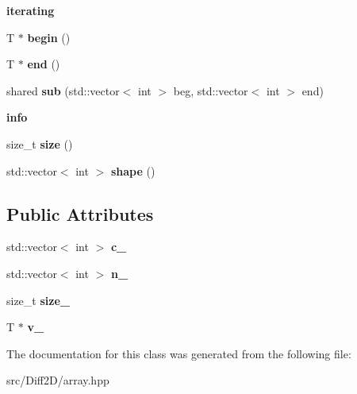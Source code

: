 \begin{Indent}{\bf iterating}\par
\begin{DoxyCompactItemize}
\item 
\hypertarget{class____array_a9e073ed33e0fad10acbbb001af3c10b1}{T $\ast$ {\bfseries begin} ()}\label{class____array_a9e073ed33e0fad10acbbb001af3c10b1}

\item 
\hypertarget{class____array_a0e7f0ce953b4d180a940c14e34b503db}{T $\ast$ {\bfseries end} ()}\label{class____array_a0e7f0ce953b4d180a940c14e34b503db}

\item 
\hypertarget{class____array_a0a736891406c46548f11a8707508d7c1}{shared {\bfseries sub} (std\-::vector$<$ int $>$ beg, std\-::vector$<$ int $>$ end)}\label{class____array_a0a736891406c46548f11a8707508d7c1}

\end{DoxyCompactItemize}
\end{Indent}
\begin{Indent}{\bf info}\par
\begin{DoxyCompactItemize}
\item 
\hypertarget{class____array_abbc3e2f4041747fdb3de9b224db7cb1e}{size\-\_\-t {\bfseries size} ()}\label{class____array_abbc3e2f4041747fdb3de9b224db7cb1e}

\item 
\hypertarget{class____array_a71abd72aa867f9a4db2fe228897654df}{std\-::vector$<$ int $>$ {\bfseries shape} ()}\label{class____array_a71abd72aa867f9a4db2fe228897654df}

\end{DoxyCompactItemize}
\end{Indent}
\subsection*{Public Attributes}
\begin{DoxyCompactItemize}
\item 
\hypertarget{class____array_aaca68729c0b849ed2f2b5813d97406b4}{std\-::vector$<$ int $>$ {\bfseries c\-\_\-}}\label{class____array_aaca68729c0b849ed2f2b5813d97406b4}

\item 
\hypertarget{class____array_aa23a824622889b5edab8fcd74d9d2ca8}{std\-::vector$<$ int $>$ {\bfseries n\-\_\-}}\label{class____array_aa23a824622889b5edab8fcd74d9d2ca8}

\item 
\hypertarget{class____array_a9e84ea9904c281c73d38730bf1c63c6f}{size\-\_\-t {\bfseries size\-\_\-}}\label{class____array_a9e84ea9904c281c73d38730bf1c63c6f}

\item 
\hypertarget{class____array_acd1bdf7fd0d7c1d9888ec5ab746e4472}{T $\ast$ {\bfseries v\-\_\-}}\label{class____array_acd1bdf7fd0d7c1d9888ec5ab746e4472}

\end{DoxyCompactItemize}


The documentation for this class was generated from the following file\-:\begin{DoxyCompactItemize}
\item 
src/\-Diff2\-D/array.\-hpp\end{DoxyCompactItemize}

